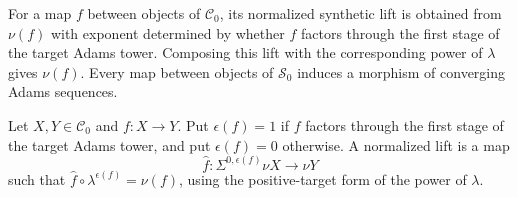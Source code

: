 \begin{definition}
\label{sem:AdamsSynthetic:normalized-map}
For a map $f$ between objects of $\mathcal C_0$, its normalized synthetic lift is obtained from $\nu(f)$ with exponent determined by whether $f$ factors through the first stage of the target Adams tower. Composing this lift with the corresponding power of $\lambda$ gives $\nu(f)$. Every map between objects of $\mathcal S_0$ induces a morphism of converging Adams sequences.

Let $X,Y\in\mathcal C_0$ and $f\colon X\to Y$. Put $\epsilon(f)=1$ if $f$ factors through the first stage of the target Adams tower, and put $\epsilon(f)=0$ otherwise. A normalized lift is a map
\[
\widehat f\colon\Sigma^{0,\epsilon(f)}\nu X\longrightarrow\nu Y
\]
such that $\widehat f\circ\lambda^{\epsilon(f)}=\nu(f)$, using the positive-target form of the power of $\lambda$.
\end{definition}


